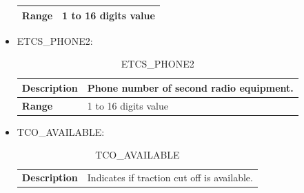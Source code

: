 \documentclass{template/openetcs}
\begin{document}
\begin{itemize}
\begin{longtable}{|l|l|}
				\hline
																																									
					\begin{minipage}[t]{0.22\linewidth} \textbf{Range}	\end{minipage} 
				&	\begin{minipage}[t]{0.78\linewidth} 1 to 16 digits value \end{minipage} \\				
				
				\hline
				
			\end{longtable}
			
		\item ETCS\_PHONE2:
											
			\begin{longtable}{|l|l|}
				\caption{ETCS\_PHONE2}\\ 
				\hline
				
					\begin{minipage}[t]{0.22\linewidth} \textbf{Description}	\end{minipage} 
				&	\begin{minipage}[t]{0.78\linewidth} Phone number of second radio equipment. \end{minipage} \\
				
				\hline
																																									
					\begin{minipage}[t]{0.22\linewidth} \textbf{Range}	\end{minipage} 
				&	\begin{minipage}[t]{0.78\linewidth} 1 to 16 digits value \end{minipage} \\				
				
				\hline
				
			\end{longtable}
			
		\item TCO\_AVAILABLE:
									
			\begin{longtable}{|l|l|}
				\caption{TCO\_AVAILABLE}\\ 
				\hline
				
					\begin{minipage}[t]{0.22\linewidth} \textbf{Description}	\end{minipage} 
				&	\begin{minipage}[t]{0.78\linewidth} Indicates if traction cut off is available. \end{minipage} \\
				

\end{longtable}
\end{itemize}
\end{document}

